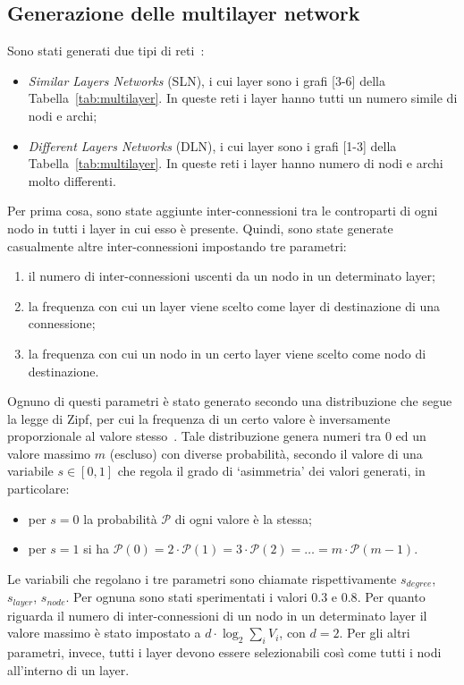 \subsection{Generazione delle multilayer network}

Sono stati generati due tipi di reti~\cite{basaras:infspmul}:
\begin{itemize}
    \item \emph{Similar Layers Networks} (SLN), i cui layer sono i grafi [3-6] della  
            Tabella~\vref{tab:multilayer}. In queste reti i layer hanno tutti un numero simile 
            di nodi e archi;
    \item \emph{Different Layers Networks} (DLN), i cui layer sono i grafi [1-3] della 
        Tabella~\ref{tab:multilayer}. In queste reti i layer hanno numero di nodi e archi molto differenti.
\end{itemize}


Per prima cosa, sono state aggiunte inter-connessioni tra le controparti di ogni nodo in tutti 
i layer in cui esso è presente.
Quindi, sono state generate casualmente altre inter-connessioni impostando tre parametri:
\begin{enumerate}
    \item il numero di inter-connessioni uscenti da un nodo in un determinato layer;
    \item la frequenza con cui un layer viene scelto come layer di destinazione di 
        una connessione;
    \item la frequenza con cui un nodo in un certo layer viene scelto come nodo 
        di destinazione. 
\end{enumerate}
Ognuno di questi parametri è stato generato secondo una distribuzione che segue 
la legge di Zipf, per cui la frequenza di un certo valore è inversamente
proporzionale al valore stesso~\cite{zipf:humanb}. 
Tale distribuzione genera numeri tra 0 ed un valore massimo $m$ (escluso) con diverse probabilità,
secondo il valore di una variabile $s \in [0, 1]$
che regola il grado di `asimmetria' dei valori generati, in particolare:
\begin{itemize}
    \item per $s=0$ la probabilità $\mathcal{P}$ di ogni valore è la stessa;  
    \item per $s=1$ si ha $\mathcal{P}(0) = 2 \cdot \mathcal{P}(1) = 3 \cdot \mathcal{P}(2) =\dots = m \cdot \mathcal{P}(m-1)$. 
\end{itemize}

Le variabili che regolano i tre parametri sono chiamate rispettivamente
$s_{degree}$, $s_{layer}$, $s_{node}$. 
Per ognuna sono stati sperimentati i valori $0.3$ e $0.8$. 
Per quanto riguarda il numero di inter-connessioni di un nodo in un determinato layer
il valore massimo è stato impostato a $d \cdot \log_2{\sum_{i}{V_i}}$, con 
$d = 2$. Per gli altri parametri, invece, tutti i layer devono essere selezionabili
così come tutti i nodi all'interno di un layer.


